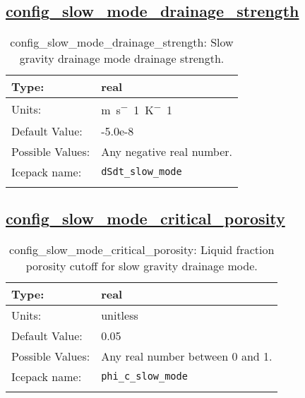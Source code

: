 \subsection[config\_slow\_mode\_drainage\_strength]{\hyperref[sec:nm_tab_thermodynamics]{config\_slow\_mode\_drainage\_strength}}
\label{subsec:nm_sec_config_slow_mode_drainage_strength}
\begin{center}
\begin{longtable}{| p{2.0in} || p{4.0in} |}
    \hline
    Type: & real \\
    \hline
    Units: & \si{m.s^-1.K^-1} \\
    \hline
    Default Value: & -5.0e-8 \\
    \hline
    Possible Values: & Any negative real number. \\
    \hline
    Icepack name: & \verb+dSdt_slow_mode+ \\
    \hline
    \caption{config\_slow\_mode\_drainage\_strength: Slow gravity drainage mode drainage strength.}
\end{longtable}
\end{center}
\subsection[config\_slow\_mode\_critical\_porosity]{\hyperref[sec:nm_tab_thermodynamics]{config\_slow\_mode\_critical\_porosity}}
\label{subsec:nm_sec_config_slow_mode_critical_porosity}
\begin{center}
\begin{longtable}{| p{2.0in} || p{4.0in} |}
    \hline
    Type: & real \\
    \hline
    Units: & \si{unitless} \\
    \hline
    Default Value: & 0.05 \\
    \hline
    Possible Values: & Any real number between 0 and 1. \\
    \hline
    Icepack name: & \verb+phi_c_slow_mode+ \\
    \hline
    \caption{config\_slow\_mode\_critical\_porosity: Liquid fraction porosity cutoff for slow gravity drainage mode.}
\end{longtable}
\end{center}
